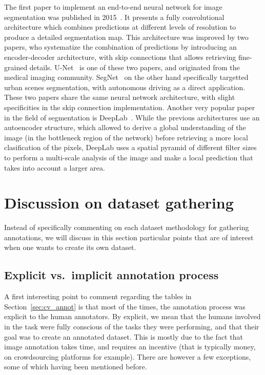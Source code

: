 The first paper to implement an end-to-end neural network
for image segmentation was published in 2015~\cite{long2015fully}.
It presents a fully convolutional architecture which combines
predictions at different levels of resolution to produce a detailed segmentation map.
This architecture was improved by two papers,
who systematize the combination of predictions by introducing
an encoder-decoder architecture,
with skip connections that allows retrieving fine-grained details.
U-Net~\cite{ronneberger2015u} is one of these two papers,
and originated from the medical imaging community.
SegNet~\cite{badrinarayanan2017segnet} on the other hand
specifically targetted urban scenes segmentation,
with autonomous driving as a direct application.
These two papers share the same neural network architecture,
with slight specificities in the skip connection implementation.
Another very popular paper in the field of segmentation is DeepLab~\cite{chen2017deeplab}.
While the previous architectures use an autoencoder structure,
which allowed to derive a global understanding of the image
(in the bottleneck region of the network) before retrieving
a more local clasification of the pixels,
DeepLab uses a spatial pyramid of different filter sizes
to perform a multi-scale analysis of the image and
make a local prediction that takes into account a larger area.

\section{Discussion on dataset gathering}

Instead of specifically commenting on each dataset methodology
for gathering annotations, we will discuss in this section
particular points that are of interest when one wants to create its own dataset.

\subsection{Explicit vs.\ implicit annotation process}

A first interesting point to comment regarding the tables in Section~\ref{sec:cv_annot}
is that most of the times, the annotation process was explicit to the human annotators.
By explicit, we mean that the humans involved in the task
were fully conscious of the tasks they were performing,
and that their goal was to create an annotated dataset.
This is mostly due to the fact that image annotation takes time,
and requires an incentive (that is typically money, on crowdsourcing platforms for example).
There are however a few exceptions, some of which having been mentioned before.


